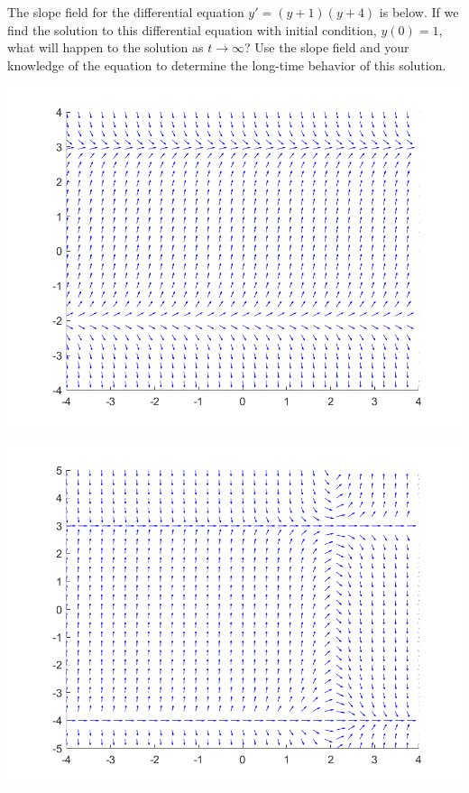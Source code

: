 \begin{exercise}\label{ex:yp1yp4}
The slope field for the differential equation $y' = (y+1)(y+4)$ is below. 
If we find the solution to this differential equation with initial condition, $y(0) = 1$, what will happen to the solution as $t \rightarrow \infty$? Use the slope field and your knowledge of the equation to determine the long-time behavior of this solution.
\end{exercise}

\begin{minipage}{0.32\textwidth}
\includegraphics[width=\textwidth]{Images/yprime3myyp2slope}
\end{minipage}%
\begin{minipage}{0.32\textwidth}
\includegraphics[width=\textwidth]{Images/yprimetm2yp4ym3slope}
\end{minipage}%
